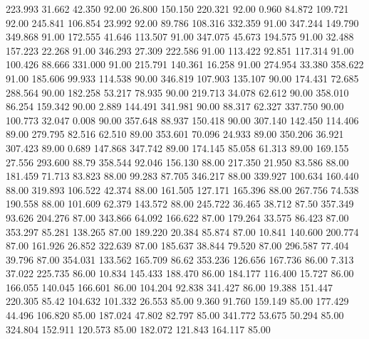  223.993   31.662   42.350        92.00
  26.800  150.150  220.321        92.00
   0.960   84.872  109.721        92.00
 245.841  106.854   23.992        92.00
  89.786  108.316  332.359        91.00
 347.244  149.790  349.868        91.00
 172.555   41.646  113.507        91.00
 347.075   45.673  194.575        91.00
  32.488  157.223   22.268        91.00
 346.293   27.309  222.586        91.00
 113.422   92.851  117.314        91.00
 100.426   88.666  331.000        91.00
 215.791  140.361   16.258        91.00
 274.954   33.380  358.622        91.00
 185.606   99.933  114.538        90.00
 346.819  107.903  135.107        90.00
 174.431   72.685  288.564        90.00
 182.258   53.217   78.935        90.00
 219.713   34.078   62.612        90.00
 358.010   86.254  159.342        90.00
   2.889  144.491  341.981        90.00
  88.317   62.327  337.750        90.00
 100.773   32.047    0.008        90.00
 357.648   88.937  150.418        90.00
 307.140  142.450  114.406        89.00
 279.795   82.516   62.510        89.00
 353.601   70.096   24.933        89.00
 350.206   36.921  307.423        89.00
   0.689  147.868  347.742        89.00
 174.145   85.058   61.313        89.00
 169.155   27.556  293.600        88.79
 358.544   92.046  156.130        88.00
 217.350   21.950   83.586        88.00
 181.459   71.713   83.823        88.00
  99.283   87.705  346.217        88.00
 339.927  100.634  160.440        88.00
 319.893  106.522   42.374        88.00
 161.505  127.171  165.396        88.00
 267.756   74.538  190.558        88.00
 101.609   62.379  143.572        88.00
 245.722   36.465   38.712        87.50
 357.349   93.626  204.276        87.00
 343.866   64.092  166.622        87.00
 179.264   33.575   86.423        87.00
 353.297   85.281  138.265        87.00
 189.220   20.384   85.874        87.00
  10.841  140.600  200.774        87.00
 161.926   26.852  322.639        87.00
 185.637   38.844   79.520        87.00
 296.587   77.404   39.796        87.00
 354.031  133.562  165.709        86.62
 353.236  126.656  167.736        86.00
   7.313   37.022  225.735        86.00
  10.834  145.433  188.470        86.00
 184.177  116.400   15.727        86.00
 166.055  140.045  166.601        86.00
 104.204   92.838  341.427        86.00
  19.388  151.447  220.305        85.42
 104.632  101.332   26.553        85.00
   9.360   91.760  159.149        85.00
 177.429   44.496  106.820        85.00
 187.024   47.802   82.797        85.00
 341.772   53.675   50.294        85.00
 324.804  152.911  120.573        85.00
 182.072  121.843  164.117        85.00
